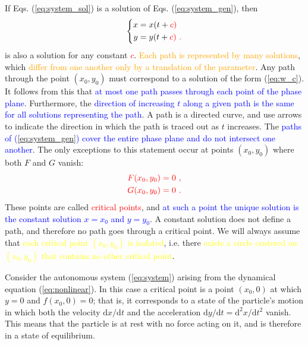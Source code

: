 \documentclass[12pt,a4paper]{article}
\newcommand{\dif}{\mathrm{d}}
\begin{document}
If Eqs. (\ref{eq:system_sol}) is a solution of Eqs. (\ref{eq:system_gen}), then
\begin{equation}
\left\{
\begin{aligned}
x & = x(t+\color{red}{c}) \\
y & = y(t+\color{red}{c}) ~.
\label{eq:w_c}
\end{aligned}
\right.
\end{equation}
is also a solution for any constant \textcolor{red}{$c$}. \textcolor{orange}{Each path is represented by many solutions}, which \textcolor{orange}{differ from one another only by a translation of the parameter}. Any path through the point $(x_0,y_0)$ must correspond to a solution of the form (\ref{eq:w_c}). It follows from this that \textcolor{blue}{at most one path passes through each point of the phase plane}. Furthermore, the \textcolor{blue}{direction of increasing $t$ along a given path is the same for all solutions representing the path}. A path is a directed curve, and use arrows to indicate the direction in which the path is traced out as $t$ increases. The \textcolor{blue}{paths of (\ref{eq:system_gen}) cover the entire phase plane and do not intersect one another}. The only exceptions to this statement occur at points $(x_0,y_0)$ where both $F$ and $G$ vanish:
\begin{align*}
\color{red} F(x_0, y_0) = 0 ~, \\
\color{red} G(x_0, y_0) = 0 ~.
\end{align*}
These points are called \textcolor{red}{critical points}, and \textcolor{blue}{at such a point the unique solution is the constant solution $x=x_0$ and $y=y_0$}. A constant solution does not define a path, and therefore no path goes through a critical point. We will always assume that \textcolor{yellow}{each critical point $(x_0,y_0)$ is isolated}, i.e.  there \textcolor{yellow}{exists a circle centered on $(x_0,y_0)$ that contains no other critical point}.

Consider the autonomous system (\ref{eq:system}) arising from the dynamical equation (\ref{eq:nonlinear}). In this case a critical point is a point $(x_0,0)$ at which $y=0$ and $f(x_0,0)=0$; that is, it corresponds to a state of the particle's motion in which both the velocity $\dif x/\dif t$ and the acceleration $\dif y/\dif t = \dif^2 x/\dif t^2$ vanish. This means that the particle is at rest with no force acting on it, and is therefore in a state of equilibrium.
\end{document}
